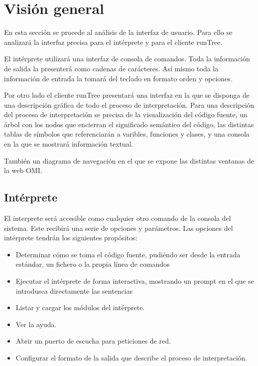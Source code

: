 \section{Visión general}
En esta sección se procede al análisis de la interfaz de usuario. Para ello se analizará la interfaz precisa 
para el intérprete y para el cliente runTree.

El intérprete utilizará una interfaz de consola de comandos. Toda la información de salida la presenterá como 
cadenas de carácteres. Así mismo toda la información de entrada la tomará del teclado en formato orden y opciones. 

Por otro lado el cliente runTree presentará una interfaz en la que se disponga de una descripción gráfica de todo el proceso 
de interpretación. Para una descripción del proceso de interpretación se precisa de la visualización del código fuente, un árbol con los nodos
que encierran el significado semántico del código, las distintas tablas de símbolos que referenciarán a varibles, funciones y clases, y una consola
en la que se mostrará información textual.

También un diagrama de navegación en el que se expone las distintas ventanas de la web OMI.
\subsection{Intérprete}
El interprete será accesible como cualquier otro comando de la consola del sistema. Este recibirá una serie de opciones y parámetros. 
Las opciones del intérprete tendrán los siguientes propósitos:
\begin{itemize}
\item Determinar cómo se toma el código fuente, pudiéndo ser desde la entrada estándar, un fichero o la propia línea de comandos
\item Ejecutar el intérprete de forma interactiva, mostrando un prompt en el que se introdusca directamente las sentencias
\item Listar y cargar los módulos del intérprete.
\item Ver la ayuda.
\item Abrir un puerto de escucha para peticiones de red.
\item Configurar el formato de la salida que describe el proceso de interpretación.
\end{itemize}

